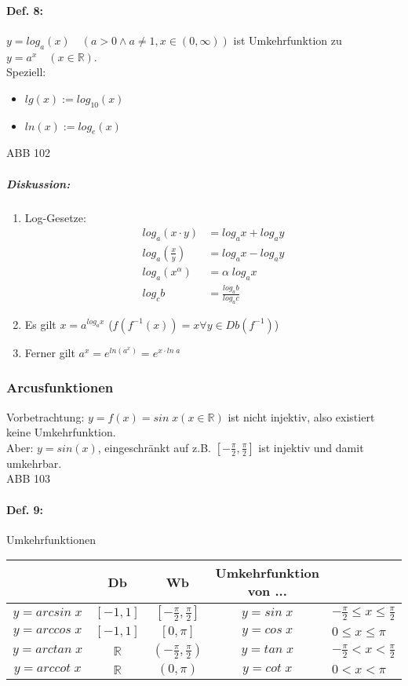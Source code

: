 \paragraph{Def. 8:}\parskp
$y=log_a (x) \quad (a>0\wedge a \not = 1, x\in (0,\infty))$ ist Umkehrfunktion zu $y=a^x \quad (x \in \mathbb{R})$.\\
Speziell: \begin{itemize}
\item $lg(x):= log_{10}(x)$
\item $ln(x):= log_e (x)$
\end{itemize}
ABB 102
\subparagraph{Diskussion:}
\begin{enumerate}
\item Log-Gesetze:
\begin{align*}
log_a(x \cdot y) &= log_a x + log_a y\\
log_a\left(\frac{x}{y}\right) &= log_a x - log_a y\\
log_a(x^{\alpha})&=\alpha \; log_a x\\
log_c b&=\frac{log_a b}{log_a c}
\end{align*}
\item Es gilt $x=a^{log_a x}$ \qquad ($f(f^{-1}(x))=x \forall y \in Db(f^{-1})$)
\item Ferner gilt $a^x=e^{ln(a^x)}=e^{x\cdot ln\;a}$
\end{enumerate}
\subsubsection{Arcusfunktionen}
Vorbetrachtung: $y=f(x)=sin\; x (x \in \mathbb{R})$ ist nicht injektiv, also existiert keine Umkehrfunktion.\\
Aber: $y=sin(x)$, eingeschränkt auf z.B. $\left[-\frac{\pi}{2}, \frac{\pi}{2}\right]$ ist injektiv und damit umkehrbar.\\
ABB 103

\paragraph{Def. 9:} \parskp
Umkehrfunktionen\\
\renewcommand{\arraystretch}{1.6}
\begin{tabular}{c | c | c | c l}
 & Db & Wb & Umkehrfunktion von ...\\
\hline
$y=arcsin\; x$ & $[-1,1]$ & $\left[-\frac{\pi}{2}, \frac{\pi}{2}\right]$ & $y=sin\;x$ & $ -\frac{\pi}{2}\leq x \leq \frac{\pi}{2}$\\
$y=arccos\; x $ & $[-1,1]$ & $[0,\pi]$ & $y=cos\; x$ & $0\leq x \leq \pi$\\
$y=arctan\; x$ & $\mathbb{R}$ & $\left(-\frac{\pi}{2}, \frac{\pi}{2}\right)$ & $y=tan \; x $ & $-\frac{\pi}{2}<x<\frac{\pi}{2}$\\
$y=arccot\; x $ & $\mathbb{R}$ & $(0,\pi)$ & $y=cot\; x$ & $0< x <\pi$\\
\end{tabular}
\renewcommand{\arraystretch}{1.3}

